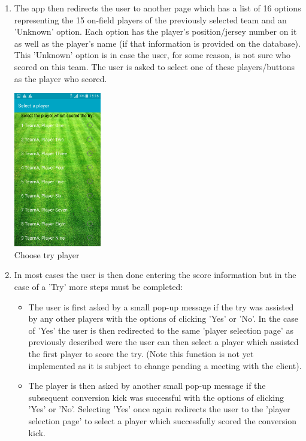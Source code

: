 \documentclass[hidelinks,a4paper,12pt]{article}
\begin{document}
\begin{enumerate}
\begin{center}
  			 \caption{Choose try team}
		\end{center}
			\item The app then redirects the user to another page which has a list of 16 options representing the 15 on-field players of the previously selected team and an 'Unknown' option. Each option has the player's position/jersey number on it as well as the player's name (if that information is provided on the database). This 'Unknown' option is in case the user, for some reason, is not sure who scored on this team. The user is asked to select one of these players/buttons as the player who scored.
		\begin{center}
  			 \includegraphics[width=0.3\textwidth] {./images/choose_try_player.png}\\[0.4cm]
  			 \caption{Choose try player}
		\end{center}
			\item In most cases the user is then done entering the score information but in the case of a 'Try' more steps must be completed:
				\begin{itemize}
					\item The user is first asked by a small pop-up message if the try was assisted by any other players with the options of clicking 'Yes' or 'No'. In the case of 'Yes' the user is then redirected to the same 'player selection page' as previously described were the user can then select a player which assisted the first player to score the try. (Note this function is not yet implemented as it is subject to change pending a meeting with the client).
					\item The player is then asked by another small pop-up message if the subsequent conversion kick was successful with the options of clicking 'Yes' or 'No'. Selecting 'Yes' once again redirects the user to the 'player selection page' to select a player which successfully scored the conversion kick.

\end{itemize}
\end{enumerate}
\end{document}
